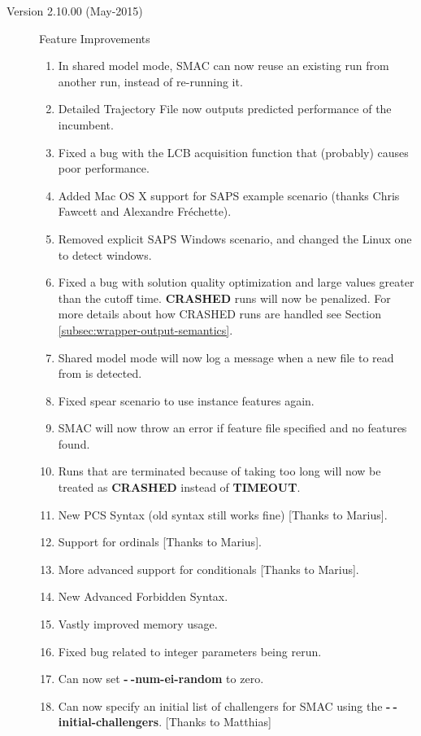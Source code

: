 \documentclass[11pt,letterpaper,oneside]{article}
\begin{document}
\begin{description}
\begin{enumerate}
          	\end{enumerate}
		\item[Version 2.10.00 (May-2015)] Feature Improvements
			\begin{enumerate}
				\item In shared model mode, SMAC can now reuse an existing run from another run, instead of re-running it.
				\item Detailed Trajectory File now outputs predicted performance of the incumbent.
				\item Fixed a bug with the LCB acquisition function that (probably) causes poor performance.
				\item Added Mac OS X support for SAPS example scenario (thanks Chris Fawcett and Alexandre Fr\'{e}chette).
				\item Removed explicit SAPS Windows scenario, and changed the Linux one to detect windows.
				\item Fixed a bug with solution quality optimization and large values greater than the cutoff time. \textbf{CRASHED} runs will now be penalized. For more details about how CRASHED runs are handled see Section \ref{subsec:wrapper-output-semantics}.
				\item Shared model mode will now log a message when a new file to read from is detected.
				\item Fixed spear scenario to use instance features again.
				\item SMAC will now throw an error if feature file specified and no features
				found.
				\item Runs that are terminated because of taking too long will now be treated as \textbf{CRASHED} instead of \textbf{TIMEOUT}.
				\item New PCS Syntax (old syntax still works fine) [Thanks to Marius].
				\item Support for ordinals [Thanks to Marius].
				\item More advanced support for conditionals [Thanks to Marius].
				\item New Advanced Forbidden Syntax.
				\item Vastly improved memory usage.
				\item Fixed bug related to integer parameters being rerun.
				\item Can now set \textbf{-$~\!$-num-ei-random} to zero.
				\item Can now specify an initial list of challengers for SMAC using the 
				\textbf{-$~\!$-initial-challengers}. [Thanks to Matthias]

\end{enumerate}
\end{description}
\end{document}
